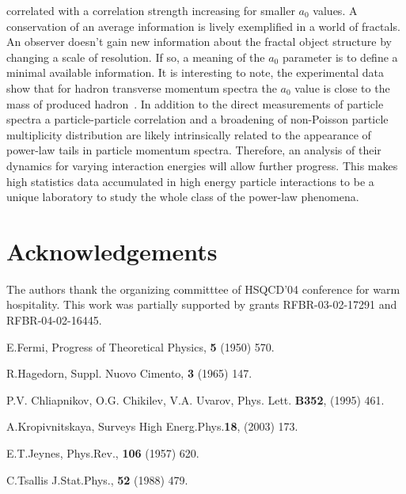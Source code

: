 \documentclass[10pt,twoside]{hsqcd}
\begin{document}
correlated with a correlation strength increasing for smaller $a_0$ 
values. A conservation of an average information is lively exemplified in 
a world of fractals. An observer doesn't gain new information about the 
fractal object structure by changing a scale of resolution. If so, a  
meaning of 
the $a_0$ parameter is to define a minimal available information. 
It is interesting to note, the experimental data 
show that for hadron transverse momentum spectra the $a_0$ value is close 
to the mass of produced hadron~\cite{HERA}.  
In addition to the direct measurements of particle spectra a
particle-particle correlation and a broadening of non-Poisson particle 
multiplicity distribution are likely intrinsically related to the 
appearance of power-law tails in particle momentum spectra. Therefore, an 
analysis of their dynamics for varying interaction energies will allow 
further progress. This makes high statistics data accumulated in high 
energy particle interactions to be a unique laboratory to study the whole 
class of the power-law phenomena.

\section*{Acknowledgements} The authors thank the organizing committtee of 
HSQCD'04 
conference for warm hospitality. This work was partially
supported by grants RFBR-03-02-17291 and RFBR-04-02-16445.

\begin{thebibliography}{0}

  E.Fermi,
Progress of Theoretical Physics, {\bf 5}  (1950) 570. 

R.Hagedorn, Suppl. Nuovo Cimento, {\bf 3} (1965) 147.

P.V. Chliapnikov, O.G. Chikilev, V.A. Uvarov,  
Phys. Lett. {\bf B352}, (1995) 461.

 A.Kropivnitskaya, Surveys High 
Energ.Phys.{\bf 18}, (2003) 173. 

  E.T.Jeynes, Phys.Rev.,
{\bf 106} (1957) 620.

C.Tsallis J.Stat.Phys., {\bf 52} (1988) 479.


\end{thebibliography}
\end{document}
